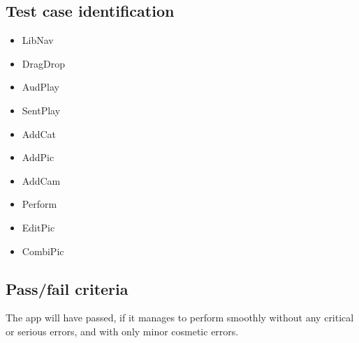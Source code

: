 \subsection*{Test case identification}
\begin{itemize}
	\item LibNav
	\item DragDrop
	\item AudPlay
	\item SentPlay
	\item AddCat
	\item AddPic
	\item AddCam
	\item Perform
	\item EditPic
	\item CombiPic
\end{itemize}

\subsection*{Pass/fail criteria}
The app will have passed, if it manages to perform smoothly without any critical or serious errors, and with only minor cosmetic errors.


